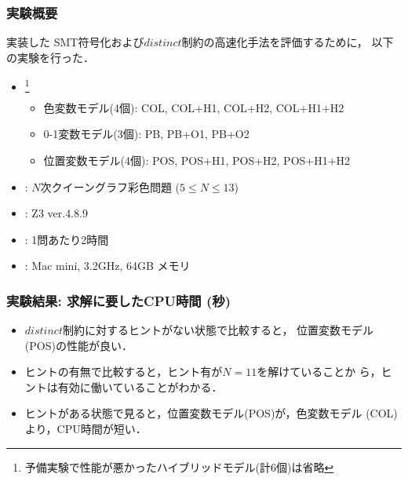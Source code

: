 \documentclass [dvipdfmx,11pt]{beamer}
\newcommand{\distinct}{$distinct$}
\begin{document}
\begin{frame}\frametitle{実験概要}
  実装した SMT符号化および{\distinct}制約の高速化手法を評価するために，
  以下の実験を行った．
  \bigskip
  \begin{itemize}
  \item {}\footnote{%
    予備実験で性能が悪かったハイブリッドモデル(計6個)は省略}
    \begin{itemize}
    \item 色変数モデル(4個): COL, COL+H1, COL+H2, COL+H1+H2
    \item 0-1変数モデル(3個): PB, PB+O1, PB+O2
    \item 位置変数モデル(4個): POS, POS+H1, POS+H2, POS+H1+H2
    \end{itemize}
  \item {}: $N$次クイーングラフ彩色問題 ($5\leq N\leq 13$)
  \item {}: Z3 ver.4.8.9
  \item {}: 1問あたり2時間
  \item {}: Mac mini, 3.2GHz, 64GB メモリ
  \end{itemize}
\end{frame}
\begin{frame}
  \frametitle{実験結果: 求解に要したCPU時間 (秒)}
  \begin{block}{}\centering
    {\tiny }
  \end{block}
  \begin{itemize}
  \item {\distinct}制約に対するヒントがない状態で比較すると，
    位置変数モデル(POS)の性能が良い．
  \item ヒントの有無で比較すると，ヒント有が$N=11$を解けていることか
    ら，ヒントは有効に働いていることがわかる．
  \item ヒントがある状態で見ると，位置変数モデル(POS)が，色変数モデル
    (COL)より，CPU時間が短い．
  \end{itemize}
\end{frame}
\end{document}

